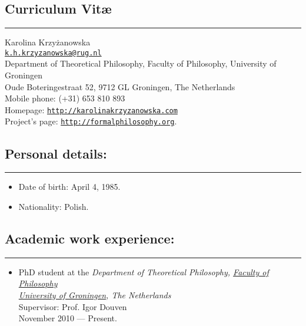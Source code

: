 \documentclass[a4paper,12pt]{article}
\begin{document}
\newcommand{\headone}[1] {
 \section*{#1}
\rule[2.5ex]{\textwidth}{2pt}}

\newcommand{\headtwo}[1]{
  \subsection*{#1}
  \rule[1.5ex]{\textwidth}{.5pt}}

\newcommand{\headthree}[1]{ {\large #1}}

\newcommand{\link}[1]{ \texttt{\href{#1}{#1}}}

\begin{small}

  \headone{Curriculum Vit\ae}
  
  Karolina Krzyżanowska\\
  \href{mailto:k.h.krzyzanowska@rug.nl}{\texttt{k.h.krzyzanowska@rug.nl}}\\
  Department of Theoretical Philosophy, Faculty of Philosophy, University of Groningen\\
  Oude Boteringestraat 52, 9712 GL Groningen, The Netherlands\\
  Mobile phone: (+31) 653 810 893\\
  Homepage: \href{http://karolinakrzyzanowska.com}{\texttt{http://karolinakrzyzanowska.com}}\\
  Project's page:
  \href{http://formalphilosophy.org}{\texttt{http://formalphilosophy.org}}.

  \headtwo{Personal details:}
  \begin{itemize}
  \item Date of birth: April 4, 1985.
 \item Nationality: Polish.
  \end{itemize}

  \headtwo{Academic work experience:}
  \begin{itemize}
  \item PhD student at
    the %
    \emph{Department of Theoretical Philosophy, \href{http://www.rug.nl/filosofie/}{Faculty of Philosophy}\\
      \href{http://www.rug.nl}{University of Groningen}, The Netherlands}\\
    Supervisor: Prof. Igor Douven\\
    November 2010 --- Present.



\end{itemize}
\end{small}
\end{document}
